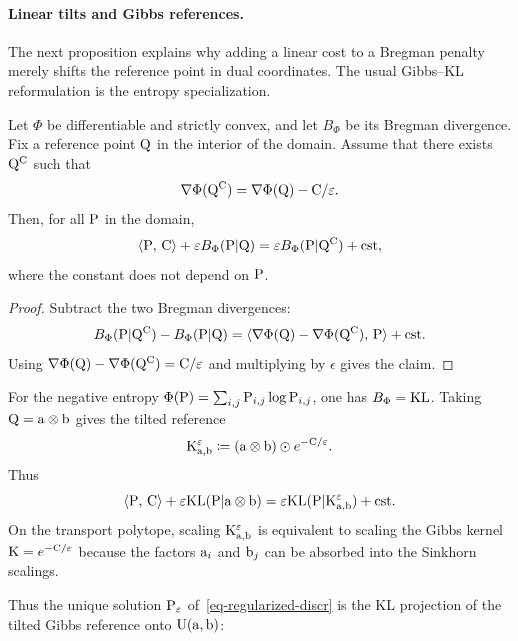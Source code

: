 \paragraph{Linear tilts and Gibbs references.}

The next proposition explains why adding a linear cost to a Bregman penalty merely shifts the reference point in dual coordinates. The usual Gibbs--KL reformulation is the entropy specialization.

\begin{prop}\label{prop-bregman-linear-tilt}
	Let $\Phi$ be differentiable and strictly convex, and let $B_\Phi$ be its Bregman divergence. Fix a reference point $\Q$ in the interior of the domain. Assume that there exists $\Q^\C$ such that
	\[
		\nabla\Phi(\Q^\C)=\nabla\Phi(\Q)-\C/\epsilon .
	\]
	Then, for all $\P$ in the domain,
	\[
		\dotp{\P}{\C}+\epsilon B_\Phi(\P|\Q)
		=
		\epsilon B_\Phi(\P|\Q^\C)+\text{\upshape cst},
	\]
	where the constant does not depend on $\P$.
\end{prop}
\begin{proof}
	Subtract the two Bregman divergences:
	\[
		B_\Phi(\P|\Q^\C)-B_\Phi(\P|\Q)
		=
		\dotp{\nabla\Phi(\Q)-\nabla\Phi(\Q^\C)}{\P}
		+\text{cst}.
	\]
	Using $\nabla\Phi(\Q)-\nabla\Phi(\Q^\C)=\C/\epsilon$ and multiplying by $\epsilon$ gives the claim.
\end{proof}

For the negative entropy $\Phi(\P)=\sum_{i,j}\P_{i,j}\log\P_{i,j}$, one has $B_\Phi=\KLD$. Taking $\Q=\a\otimes\b$ gives the tilted reference
\[
	\K_{\a,\b}^\epsilon
	\eqdef
	(\a\otimes\b)\odot e^{-\C/\epsilon}.
\]
Thus
\[
	\dotp{\P}{\C}+\epsilon\KLD(\P|\a\otimes\b)
	=
	\epsilon\KLD(\P|\K_{\a,\b}^\epsilon)+\text{\upshape cst}.
\]
On the transport polytope, scaling $\K_{\a,\b}^\epsilon$ is equivalent to scaling the Gibbs kernel $\K=e^{-\C/\epsilon}$ because the factors $\a_i$ and $\b_j$ can be absorbed into the Sinkhorn scalings.

Thus the unique solution $\P_\epsilon$ of~\eqref{eq-regularized-discr} is the KL projection of the tilted Gibbs reference onto $\CouplingsD(\a,\b)$:

